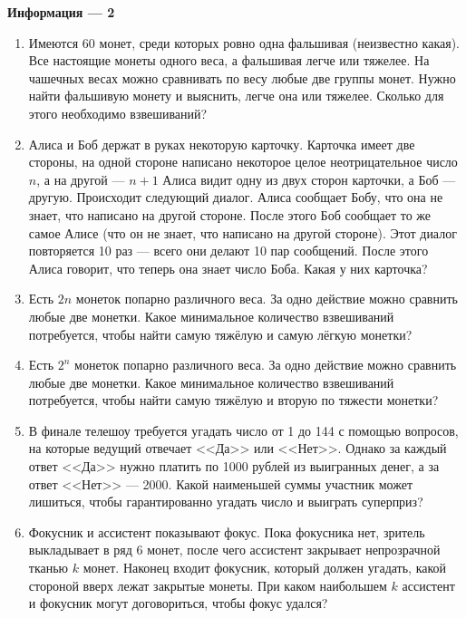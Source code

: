 \documentclass{article}
\begin{document}
\large
	
	
\begin{center}
	\textbf{Информация --- 2}
\end{center}

\begin{enumerate}[label*=\protect\fbox{\arabic{enumi}}]

\item Имеются 60 монет, среди которых ровно одна фальшивая (неизвестно какая). Все настоящие монеты одного веса, а фальшивая легче или тяжелее. На чашечных весах можно сравнивать по весу любые две группы монет. Нужно найти фальшивую монету и выяснить, легче она или тяжелее. Сколько для этого необходимо взвешиваний?

\item Алиса и Боб держат в руках некоторую карточку. Карточка имеет две стороны, на одной стороне написано некоторое целое неотрицательное число $n$, а на другой — $n + 1$ Алиса видит одну из двух сторон карточки, а Боб — другую. Происходит следующий диалог. Алиса сообщает Бобу, что она не знает, что написано на другой стороне. После этого Боб сообщает то же самое Алисе (что он не знает, что написано на другой стороне). Этот диалог повторяется 10 раз — всего они делают 10 пар сообщений. После этого Алиса говорит, что теперь она знает число Боба. Какая
у них карточка?

\item Есть $2n$ монеток попарно различного веса. За одно действие можно сравнить любые две монетки. Какое минимальное количество взвешиваний потребуется, чтобы найти самую тяжёлую и самую лёгкую монетки?

\item Есть $2^n$ монеток попарно различного веса. За одно действие можно сравнить любые две монетки. Какое минимальное количество взвешиваний потребуется, чтобы найти самую тяжёлую и вторую по тяжести монетки?

\item В финале телешоу требуется угадать число от 1 до 144 с помощью вопросов, на которые ведущий отвечает <<Да>> или <<Нет>>. Однако за каждый ответ <<Да>> нужно платить по 1000 рублей из выигранных денег, а за ответ <<Нет>> --- 2000. Какой наименьшей суммы участник может лишиться, чтобы гарантированно угадать число и выиграть суперприз?

\item Фокусник и ассистент показывают фокус. Пока фокусника нет, зритель выкладывает в ряд 6 монет, после чего ассистент закрывает непрозрачной тканью $k$ монет. Наконец входит фокусник, который должен угадать, какой стороной вверх лежат закрытые монеты. При каком наибольшем $k$ ассистент и фокусник могут договориться, чтобы фокус удался?


\end{enumerate}
\end{document}
